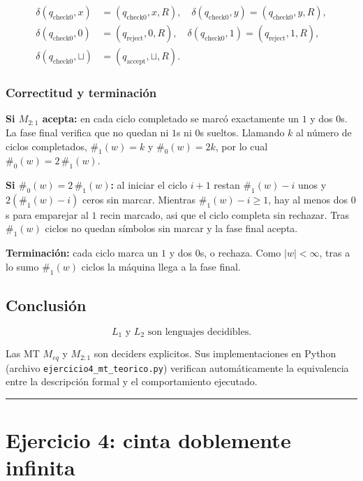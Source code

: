 \documentclass[11pt,a4paper]{article}
\theoremstyle{plain}
\theoremstyle{definition}
\theoremstyle{remark}
\newcommand{\qaccept}{q_{\text{accept}}}
\newcommand{\qreject}{q_{\text{reject}}}
\newcommand{\qcheckzero}{q_{\text{check0}}}
\newcommand{\countz}{\#_{0}}
\newcommand{\countu}{\#_{1}}
\newcommand{\blank}{\sqcup}
\begin{document}
\begin{align*}
\delta(\qcheckzero,x) &= (\qcheckzero,x,R),\quad
\delta(\qcheckzero,y) = (\qcheckzero,y,R),\\
\delta(\qcheckzero,0) &= (\qreject,0,R),\quad
\delta(\qcheckzero,1) = (\qreject,1,R),\\
\delta(\qcheckzero,\blank) &= (\qaccept,\blank,R).
\end{align*}

\subsubsection*{Correctitud y terminaci\'on}

\textbf{Si $M_{2{:}1}$ acepta:} en cada ciclo completado se marc\'o
exactamente un $1$ y dos $0$s. La fase final verifica que no quedan ni $1$s
ni $0$s sueltos. Llamando $k$ al n\'umero de ciclos completados,
$\countu(w)=k$ y $\countz(w)=2k$, por lo cual
$\countz(w)=2\,\countu(w)$.

\textbf{Si $\countz(w)=2\,\countu(w)$:} al iniciar el ciclo $i+1$ restan
$\countu(w)-i$ unos y $2(\countu(w)-i)$ ceros sin marcar. Mientras
$\countu(w)-i\ge 1$, hay al menos dos $0$s para emparejar al $1$ recin
marcado, asi que el ciclo completa sin rechazar. Tras $\countu(w)$ ciclos no
quedan s\'imbolos sin marcar y la fase final acepta.

\textbf{Terminaci\'on:} cada ciclo marca un $1$ y dos $0$s, o rechaza. Como
$|w|<\infty$, tras a lo sumo $\countu(w)$ ciclos la m\'aquina llega a la
fase final.

\subsection*{Conclusi\'on}

\[
  \boxed{L_1 \text{ y } L_2 \text{ son lenguajes decidibles.}}
\]

Las MT $M_{eq}$ y $M_{2{:}1}$ son deciders explicitos. Sus implementaciones
en Python (archivo \texttt{ejercicio4\_mt\_teorico.py}) verifican
autom\'aticamente la equivalencia entre la descripci\'on formal y el
comportamiento ejecutado.

\bigskip\hrule\bigskip

\section{Ejercicio 4: cinta doblemente infinita}
\label{sec:ej4}
\end{document}
